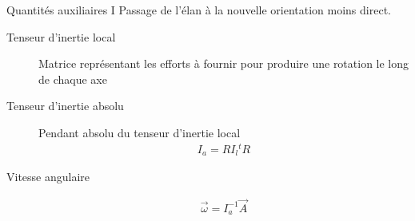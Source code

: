 \documentclass{beamer}
\begin{document}
\begin{frame}{Quantités auxiliaires I}
  Passage de l'élan à la nouvelle orientation moins direct.
  
  \vfill

  \begin{description}
  \item[Tenseur d'inertie local]
    Matrice représentant les efforts à fournir pour produire une rotation le long de chaque axe

    \vfill

  \item[Tenseur d'inertie absolu]
    Pendant absolu du tenseur d'inertie local
    \begin{align*}
      I_a = R I_l {}^t\!\!R
    \end{align*}

    \vfill

  \item[Vitesse angulaire]
    \begin{align*}
      \vec{\omega} = I^{-1}_a \vec{A}
    \end{align*}
  \end{description}
\end{frame}
\end{document}
